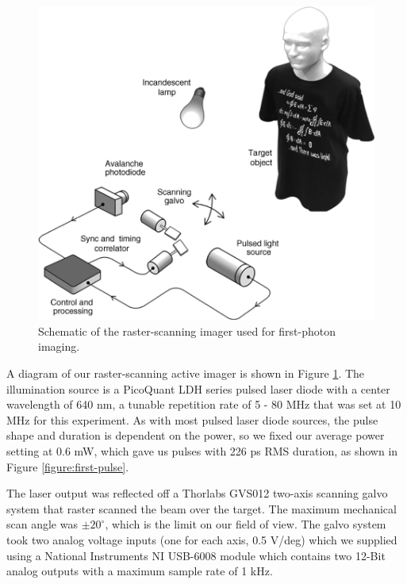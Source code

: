 \begin{figure}[htb]
\centerline{\includegraphics[width=14cm]{figure-first-setup.pdf}}
\caption{Schematic of the raster-scanning imager used for first-photon imaging.}
\label{figure:first-setup}
\end{figure}

A diagram of our raster-scanning active imager is shown in Figure \ref{figure:first-setup}. The illumination source is a PicoQuant LDH series pulsed laser diode with a center wavelength of 640 nm, a tunable repetition rate of 5 - 80 MHz that was set at 10 MHz for this experiment. As with most pulsed laser diode sources, the pulse shape and duration is dependent on the power, so we fixed our average power setting at 0.6 mW, which gave us pulses with 226 ps RMS duration, as shown in Figure \ref{figure:first-pulse}.

The laser output was reflected off a Thorlabs GVS012 two-axis scanning galvo system that raster scanned the beam over the target. The maximum mechanical scan angle was $\pm 20^\circ$, which is the limit on our field of view. The galvo system took two analog voltage inputs (one for each axis, 0.5 V/deg) which we supplied using a National Instruments NI USB-6008 module which contains two 12-Bit analog outputs with a maximum sample rate of 1 kHz.

